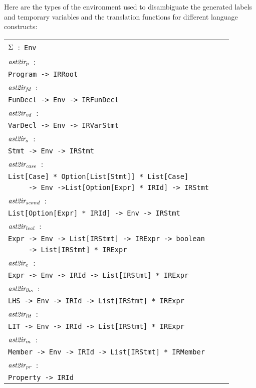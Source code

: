 Here are the types of the environment used to disambiguate the generated labels and
temporary variables and the translation functions for different language constructs:

\medskip
\small
\begin{tabular}{lll}
$\Sigma$\ :\  \verb+Env+\\
$\emph{ast2ir}_p$\ :\\
\verb+Program -> IRRoot+\\
$\emph{ast2ir}_{\emph{fd}}$\ :\\
\verb+FunDecl -> Env -> IRFunDecl+\\
$\emph{ast2ir}_{\emph{vd}}$\ :\\
\verb+VarDecl -> Env -> IRVarStmt+\\
$\emph{ast2ir}_s$\ :\\
\verb+Stmt -> Env -> IRStmt+\\
$\emph{ast2ir}_\emph{case}$\ :\\
\verb!List[Case] * Option[List[Stmt]] * List[Case]!\\
\verb+     -> Env ->List[Option[Expr] * IRId] -> IRStmt+\\
$\emph{ast2ir}_\emph{scond}$\ :\\
 \verb+List[Option[Expr] * IRId] -> Env -> IRStmt+\\
$\emph{ast2ir}_{\emph{lval}}$\ :\\
\verb+Expr -> Env -> List[IRStmt] -> IRExpr -> boolean+\\
\verb+     -> List[IRStmt] * IRExpr+\\
$\emph{ast2ir}_e$\ :\\
\verb+Expr -> Env -> IRId -> List[IRStmt] * IRExpr+\\
$\emph{ast2ir}_{\emph{lhs}}$\ :\\
\verb+LHS -> Env -> IRId -> List[IRStmt] * IRExpr+\\
$\emph{ast2ir}_{\emph{lit}}$\ :\\
\verb+LIT -> Env -> IRId -> List[IRStmt] * IRExpr+\\
$\emph{ast2ir}_m$\ :\\
\verb+Member -> Env -> IRId -> List[IRStmt] * IRMember+\\
$\emph{ast2ir}_{\emph{pr}}$\ :\\
\verb+Property -> IRId+
\end{tabular}

